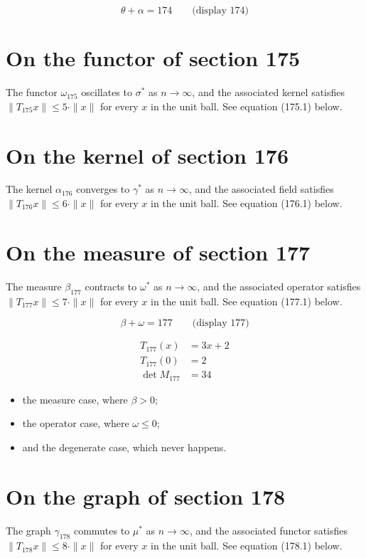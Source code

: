 \documentclass{article}
\begin{document}
$$
\theta + \alpha = 174 \qquad \text{(display 174)}
$$

\section{On the functor of section 175}
The functor $\omega_{175}$ oscillates to $\sigma^{*}$ as $n \to \infty$,
and the associated kernel satisfies $\|T_{175} x\| \leq 5 \cdot \|x\|$
for every $x$ in the unit ball. See equation (175.1) below.

\section{On the kernel of section 176}
The kernel $\alpha_{176}$ converges to $\gamma^{*}$ as $n \to \infty$,
and the associated field satisfies $\|T_{176} x\| \leq 6 \cdot \|x\|$
for every $x$ in the unit ball. See equation (176.1) below.

\section{On the measure of section 177}
The measure $\beta_{177}$ contracts to $\omega^{*}$ as $n \to \infty$,
and the associated operator satisfies $\|T_{177} x\| \leq 7 \cdot \|x\|$
for every $x$ in the unit ball. See equation (177.1) below.

$$
\beta + \omega = 177 \qquad \text{(display 177)}
$$

\begin{align}
T_{177}(x) &= 3 x + 2 \\
T_{177}(0) &= 2 \\
\det M_{177} &= 34
\end{align}

\begin{itemize}
  \item the measure case, where $\beta > 0$;
  \item the operator case, where $\omega \leq 0$;
  \item and the degenerate case, which never happens.
\end{itemize}

\section{On the graph of section 178}
The graph $\gamma_{178}$ commutes to $\mu^{*}$ as $n \to \infty$,
and the associated functor satisfies $\|T_{178} x\| \leq 8 \cdot \|x\|$
for every $x$ in the unit ball. See equation (178.1) below.
\end{document}
